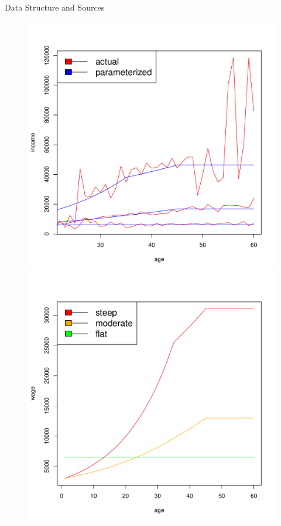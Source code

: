 \documentclass{beamer}
\begin{document}
\begin{frame}[allowframebreaks]{Data Structure and Sources}
\begin{itemize}
\begin{figure}[h]
		\includegraphics[scale=0.25]{figs/heterwage.pdf}
		\includegraphics[scale=0.25]{figs/heterwageless.pdf}
\end{figure}



\end{itemize}
\end{frame}
\end{document}

